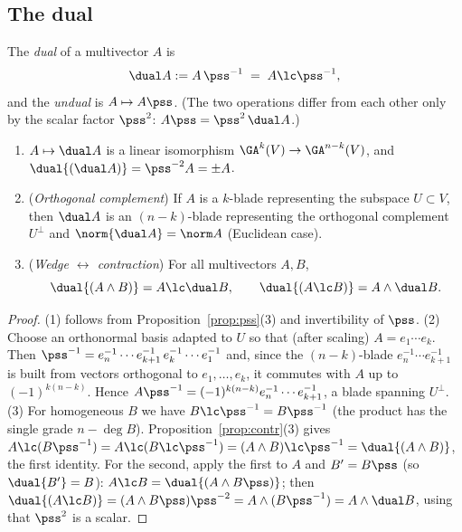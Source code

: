 \subsection{The dual}

\begin{definition}\label{def:dual}
The \emph{dual} of a multivector $A$ is
\[
 \dual A:=A\,\pss^{-1}\;=\;A\lc\pss^{-1},
\]
and the \emph{undual} is $A\mapsto A\pss$. (The two operations differ from each other only by the scalar factor $\pss^{2}$: $A\pss=\pss^2\,\dual A$.)
\end{definition}

\begin{theorem}\label{thm:dual}
\begin{enumerate}
  \item $A\mapsto\dual A$ is a linear isomorphism $\GA^k(V)\to\GA^{n-k}(V)$, and $\dual{(\dual A)}=\pss^{-2}A=\pm A$.
  \item (\emph{Orthogonal complement}) If $A$ is a $k$-blade representing the subspace $U\subset V$, then $\dual A$ is an $(n-k)$-blade representing the orthogonal complement $U^\perp$ and $\norm{\dual A}=\norm A$ (Euclidean case).
  \item (\emph{Wedge $\leftrightarrow$ contraction}) For all multivectors $A,B$,
  \begin{equation}\label{eq:dualduality}
   \dual{(A\wedge B)}=A\lc\dual B,\qquad \dual{(A\lc B)}=A\wedge\dual B .
  \end{equation}
\end{enumerate}
\end{theorem}
\begin{proof}
(1) follows from Proposition~\ref{prop:pss}(3) and invertibility of $\pss$.
(2) Choose an orthonormal basis adapted to $U$ so that (after scaling) $A=e_1\cdots e_k$. Then $\pss^{-1}=e_n^{-1}\cdots e_{k+1}^{-1}\,e_k^{-1}\cdots e_1^{-1}$ and, since the $(n-k)$-blade $e_n^{-1}\cdots e_{k+1}^{-1}$ is built from vectors orthogonal to $e_1,\dots,e_k$, it commutes with $A$ up to $(-1)^{k(n-k)}$. Hence $A\pss^{-1}=(-1)^{k(n-k)}e_n^{-1}\cdots e_{k+1}^{-1}$, a blade spanning $U^\perp$.
(3) For homogeneous $B$ we have $B\lc\pss^{-1}=B\pss^{-1}$ (the product has the single grade $n-\deg B$). Proposition~\ref{prop:contr}(3) gives
$A\lc(B\pss^{-1})=A\lc(B\lc\pss^{-1})=(A\wedge B)\lc\pss^{-1}=\dual{(A\wedge B)}$, the first identity. For the second, apply the first to $A$ and $B'=B\pss$ (so $\dual{B'}=B$): $A\lc B=\dual{(A\wedge B\pss)}$; then $\dual{(A\lc B)}=(A\wedge B\pss)\pss^{-2}=A\wedge(B\pss^{-1})=A\wedge\dual B$, using that $\pss^{2}$ is a scalar.
\end{proof}

